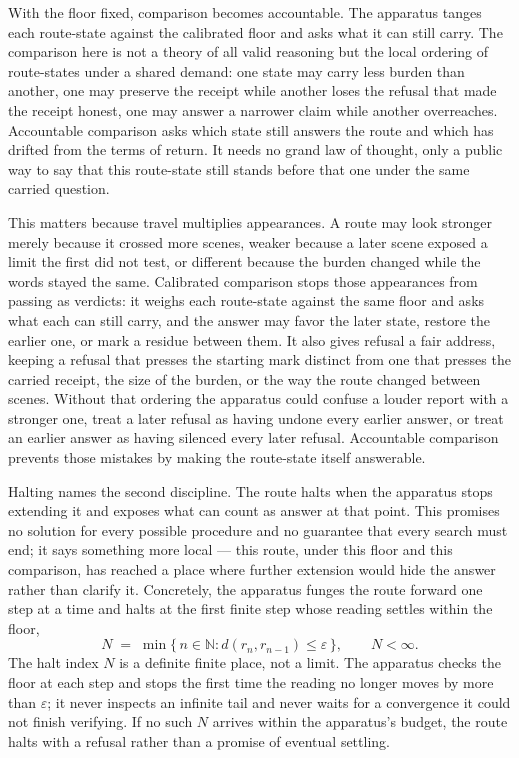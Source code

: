 With the floor fixed, comparison becomes accountable. The apparatus tanges each route-state against the calibrated floor and asks what it can still carry. The comparison here is not a theory of all valid reasoning but the local ordering of route-states under a shared demand: one state may carry less burden than another, one may preserve the receipt while another loses the refusal that made the receipt honest, one may answer a narrower claim while another overreaches. Accountable comparison asks which state still answers the route and which has drifted from the terms of return. It needs no grand law of thought, only a public way to say that this route-state still stands before that one under the same carried question.

This matters because travel multiplies appearances. A route may look stronger merely because it crossed more scenes, weaker because a later scene exposed a limit the first did not test, or different because the burden changed while the words stayed the same. Calibrated comparison stops those appearances from passing as verdicts: it weighs each route-state against the same floor and asks what each can still carry, and the answer may favor the later state, restore the earlier one, or mark a residue between them. It also gives refusal a fair address, keeping a refusal that presses the starting mark distinct from one that presses the carried receipt, the size of the burden, or the way the route changed between scenes. Without that ordering the apparatus could confuse a louder report with a stronger one, treat a later refusal as having undone every earlier answer, or treat an earlier answer as having silenced every later refusal. Accountable comparison prevents those mistakes by making the route-state itself answerable.

Halting names the second discipline. The route halts when the apparatus stops extending it and exposes what can count as answer at that point. This promises no solution for every possible procedure and no guarantee that every search must end; it says something more local --- this route, under this floor and this comparison, has reached a place where further extension would hide the answer rather than clarify it. Concretely, the apparatus funges the route forward one step at a time and halts at the first finite step whose reading settles within the floor,
\[ N \;=\; \min\{\, n \in \mathbb{N} : d(r_n, r_{n-1}) \le \varepsilon \,\}, \qquad N < \infty. \]
The halt index $N$ is a definite finite place, not a limit. The apparatus checks the floor at each step and stops the first time the reading no longer moves by more than $\varepsilon$; it never inspects an infinite tail and never waits for a convergence it could not finish verifying. If no such $N$ arrives within the apparatus's budget, the route halts with a refusal rather than a promise of eventual settling.

